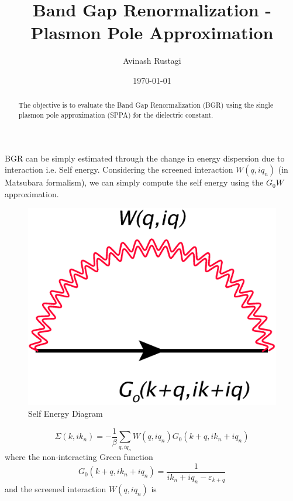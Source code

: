 \documentclass[aps,prb,onecolumn,notitlepage,showpacs,floatfix,superscriptaddress]{revtex4-1}
\begin{document}
\title{Band Gap Renormalization - Plasmon Pole Approximation}

\author{Avinash Rustagi}
%
\date{\today}
\begin{abstract}
The objective is to evaluate the Band Gap Renormalization (BGR) using the single plasmon pole approximation (SPPA) for the dielectric constant. 
\end{abstract}
\maketitle
BGR can be simply estimated through the change in energy dispersion due to interaction i.e. Self energy. Considering the screened interaction $W(q,iq_n)$ (in Matsubara formalism), we can simply compute the self energy using the $G_0 W$ approximation.
\begin{figure}[hbtp]
\centering
\includegraphics[scale=0.1]{G0W.png}
\caption{Self Energy Diagram}
\end{figure}
\begin{equation}
\Sigma(k,ik_n) = -\dfrac{1}{\beta} \sum_{q,iq_n} W(q,iq_n) G_0 (k+q,ik_n+iq_n)
\end{equation}
where the non-interacting Green function
\begin{equation}
 G_0 (k+q,ik_n+iq_n) = \dfrac{1}{ik_n + iq_n -\varepsilon_{k+q}}
\end{equation}
and the screened interaction $W(q,iq_n)$ is
\end{document}
